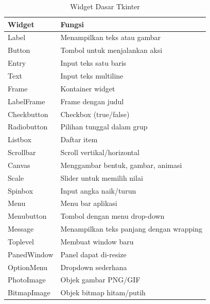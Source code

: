 \begin{table}[H]
  \centering
  \caption{Widget Dasar Tkinter}
  \label{tab:b11-widget}
  \begin{tabularx}{\textwidth}{lX}
    \hline
    \textbf{Widget} & \textbf{Fungsi} \\
    \hline
    Label & Menampilkan teks atau gambar \\
    \hline
    Button & Tombol untuk menjalankan aksi \\
    \hline
    Entry & Input teks satu baris \\
    \hline
    Text & Input teks multiline \\
    \hline
    Frame & Kontainer widget \\
    \hline
    LabelFrame & Frame dengan judul \\
    \hline
    Checkbutton & Checkbox (true/false) \\
    \hline
    Radiobutton & Pilihan tunggal dalam grup \\
    \hline
    Listbox & Daftar item \\
    \hline
    Scrollbar & Scroll vertikal/horizontal \\
    \hline
    Canvas & Menggambar bentuk, gambar, animasi \\
    \hline
    Scale & Slider untuk memilih nilai \\
    \hline
    Spinbox & Input angka naik/turun \\
    \hline
    Menu & Menu bar aplikasi \\
    \hline
    Menubutton & Tombol dengan menu drop-down \\
    \hline
    Message & Menampilkan teks panjang dengan wrapping \\
    \hline
    Toplevel & Membuat window baru \\
    \hline
    PanedWindow & Panel dapat di-resize \\
    \hline
    OptionMenu & Dropdown sederhana \\
    \hline
    PhotoImage & Objek gambar PNG/GIF \\
    \hline
    BitmapImage & Objek bitmap hitam/putih \\
    \hline
  \end{tabularx}
\end{table}

